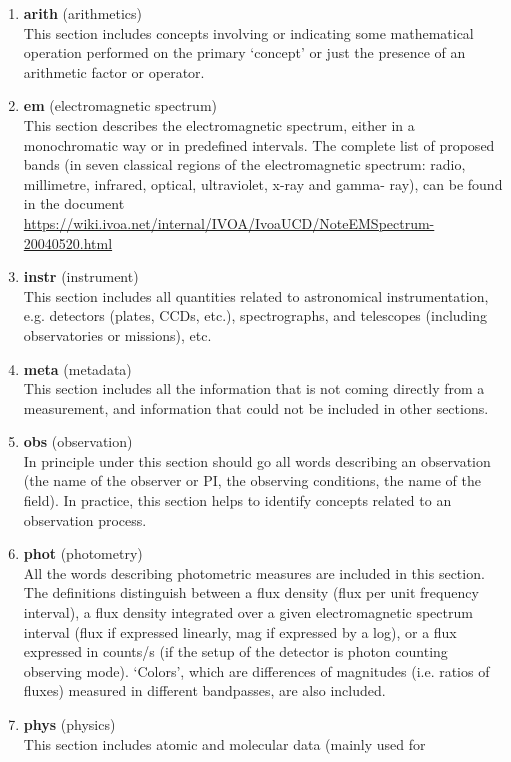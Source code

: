 \documentclass[11pt,a4paper]{ivoa}
\begin{document}
\begin{enumerate}
\item {\bf arith} (arithmetics)\\ This section includes concepts involving or indicating some 
mathematical operation performed on the primary `concept' or just the presence of an arithmetic 
factor or operator.
\item {\bf em} (electromagnetic spectrum)\\ This section describes the electromagnetic spectrum, 
either in a monochromatic way or in predefined intervals. The complete list of proposed bands (in 
seven classical regions of the electromagnetic spectrum: radio, millimetre, infrared, optical, 
ultraviolet, x-ray and gamma- ray), can be found in the document 
\url{https://wiki.ivoa.net/internal/IVOA/IvoaUCD/NoteEMSpectrum-20040520.html}
\item {\bf instr} (instrument)\\ This section includes all quantities related to astronomical 
instrumentation, e.g. detectors (plates, CCDs, etc.), spectrographs, and telescopes (including 
observatories or missions), etc.
\item {\bf meta} (metadata)\\ This section includes all the information that is not coming directly 
from a measurement, and information that could not be included in other sections.
\item {\bf obs} (observation)\\ In principle under this section should go all words describing an 
observation (the name of the observer or PI, the observing conditions, the name of the field). In 
practice, this section helps to identify concepts related to an observation process.
\item {\bf phot} (photometry)\\ All the words describing photometric measures are included in this 
section. The definitions distinguish between a flux density (flux per unit frequency interval), a 
flux density integrated over a given electromagnetic spectrum interval (flux if expressed linearly, 
mag if expressed by a log), or a flux expressed in counts/s (if the setup of the detector is photon 
counting observing mode). `Colors', which are differences of magnitudes (i.e. ratios of fluxes) 
measured in different bandpasses, are also included.
\item {\bf phys} (physics)\\ This section includes atomic and molecular data (mainly used for 

\end{enumerate}
\end{document}
